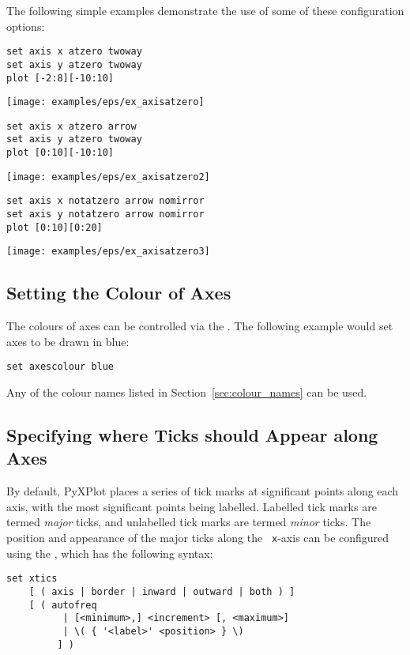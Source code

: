 The following simple examples demonstrate the use of some of these configuration options:
\begin{verbatim}
set axis x atzero twoway
set axis y atzero twoway
plot [-2:8][-10:10]
\end{verbatim}

\centerline{\texttt{[image: examples/eps/ex\_axisatzero]}}

\begin{verbatim}
set axis x atzero arrow
set axis y atzero twoway
plot [0:10][-10:10]
\end{verbatim}

\centerline{\texttt{[image: examples/eps/ex\_axisatzero2]}}

\begin{verbatim}
set axis x notatzero arrow nomirror
set axis y notatzero arrow nomirror
plot [0:10][0:20]
\end{verbatim}

\centerline{\texttt{[image: examples/eps/ex\_axisatzero3]}}

\subsection{Setting the Colour of Axes}

The colours of axes can be controlled
via the .  The following example would set axes to be
drawn in blue:

\begin{verbatim}
set axescolour blue
\end{verbatim}

\noindent Any of the colour names listed in Section~\ref{sec:colour_names} can
be used.

\subsection{Specifying where Ticks should Appear along Axes}

By default, PyXPlot places a series of tick marks at significant points along
each axis, with the most significant points being labelled.  Labelled tick
marks are termed {\it major} ticks, and unlabelled tick marks are termed {\it
minor} ticks.  The position and appearance of the major ticks along the {\tt
x}-axis can be configured using the , which has the
following syntax:

\begin{verbatim}
set xtics
    [ ( axis | border | inward | outward | both ) ]
    [ ( autofreq
          | [<minimum>,] <increment> [, <maximum>]
          | \( { '<label>' <position> } \)
         ] )
\end{verbatim}

